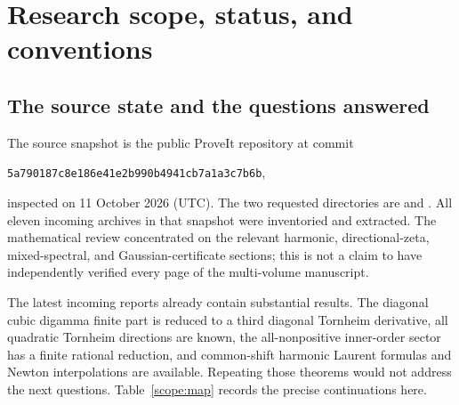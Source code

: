 \section{Research scope, status, and conventions}
\label{scope:section}

\subsection{The source state and the questions answered}

The source snapshot is the public ProveIt repository at commit
\begin{center}
\texttt{5a790187c8e186e41e2b990b4941cb7a1a3c7b6b},
\end{center}
inspected on 11 October 2026 (UTC). The two requested directories are
 and 
\cite{RepoMain,RepoIncoming}. All eleven incoming archives in that
snapshot were inventoried and extracted. The mathematical review
concentrated on the relevant harmonic, directional-zeta, mixed-spectral,
and Gaussian-certificate sections; this is not a claim to have
independently verified every page of the multi-volume manuscript.

The latest incoming reports already contain substantial results.
The diagonal cubic digamma finite part is reduced to a third diagonal
Tornheim derivative, all quadratic Tornheim directions are known, the
all-nonpositive inner-order sector has a finite rational reduction,
and common-shift harmonic Laurent formulas and Newton interpolations
are available. Repeating those theorems would not address the next
questions. Table~\ref{scope:map} records the precise continuations here.

